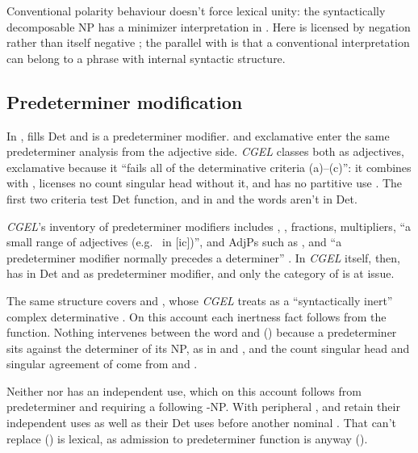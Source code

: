 \documentclass[12pt]{article}
\begin{document}
Conventional polarity behaviour doesn't force lexical unity: the syntactically decomposable NP  has a minimizer interpretation in  \citep[549--550, 725]{huddleston2002}. Here  is licensed by negation rather than itself negative \citep[822--823]{huddleston2002}; the parallel with  is that a conventional interpretation can belong to a phrase with internal syntactic structure.

\subsection{Predeterminer modification}\label{sec:predeterminer-a}

In ,  fills Det and  is a predeterminer modifier.  and exclamative  enter the same predeterminer analysis from the adjective side. \textit{CGEL} classes both as adjectives, exclamative  because it \enquote{fails all of the determinative criteria (a)--(c)}: it combines with , licenses no count singular head without it, and has no partitive use \citep[539--540]{huddleston2002}. The first two criteria test Det function, and in  and  the words aren't in Det.

\textit{CGEL}'s inventory of predeterminer modifiers includes , , fractions, multipliers, \enquote{a small range of adjectives (e.g.\  in [ic])}, and AdjPs such as , and \enquote{a predeterminer modifier normally precedes a determiner} \citep[331]{huddleston2002}. In \textit{CGEL} itself, then,  has  in Det and  as predeterminer modifier, and only the category of  is at issue.

The same structure covers  and , whose  \textit{CGEL} treats as a \enquote{syntactically inert} complex determinative \citep[394]{huddleston2002}. On this account each inertness fact follows from the function. Nothing intervenes between the word and  () because a predeterminer sits against the determiner of its NP, as in  and , and the count singular head and singular agreement of  come from  and .

Neither  nor  has an independent use, which on this account follows from predeterminer  and  requiring a following -NP. With peripheral ,  and  retain their independent uses as well as their Det uses before another nominal \citep[392, 394]{huddleston2002}. That  can't replace  () is lexical, as admission to predeterminer function is anyway ().
\end{document}
